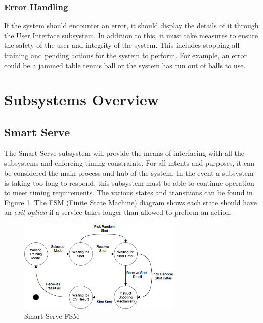 \documentclass[11pt]{article}
\begin{document}
\subsubsection{Error Handling}
If the system should encounter an error, it should display the details of it through the User Interface subsystem. In addition to this, it must take measures to ensure the safety of the user and integrity of the system. This includes stopping all training and pending actions for the system to perform. For example, an error could be a jammed table tennis ball or the system has run out of balls to use.
\section{Subsystems Overview}
\subsection{Smart Serve}
The Smart Serve subsystem will provide the means of interfacing with all the subsystems and enforcing timing constraints. For all intents and purposes, it can be considered the main process and hub of the system. In the event a subsystem is taking too long to respond, this subsystem must be able to continue operation to meet timing requirements. The various states and transitions can be found in Figure \ref{fig:fsm}. The FSM (Finite State Machine) diagram shows each state should have an \textit{exit option} if a service takes longer than allowed to preform an action.
\begin{figure}[H]
   \centering
   \includegraphics[width=0.7\textwidth]{img/FSM.png}
   \caption{Smart Serve FSM}
   \label{fig:fsm}
\end{figure}
\end{document}
